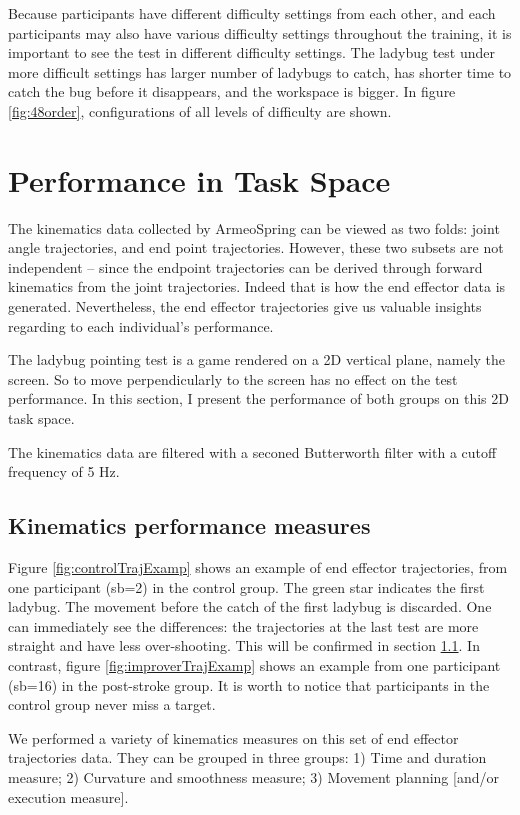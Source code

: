 Because participants have different difficulty settings from each other, and each participants may also have various difficulty settings throughout the training, it is important to see the test in different difficulty settings. The ladybug test under more difficult settings has larger number of ladybugs to catch, has shorter time to catch the bug before it disappears, and the workspace is bigger. In figure \ref{fig:48order}, configurations of all levels of difficulty are shown.

\section{Performance in Task Space}

The kinematics data collected by ArmeoSpring can be viewed as two folds: joint angle trajectories, and end point trajectories. However, these two subsets are not independent -- since the endpoint trajectories can be derived through forward kinematics from the joint trajectories. Indeed that is how the end effector data is generated. Nevertheless, the end effector trajectories give us valuable insights regarding to each individual's performance.

The ladybug pointing test is a game rendered on a 2D vertical plane, namely the screen. So to move perpendicularly to the screen has no effect on the test performance. In this section, I present the performance of both groups on this 2D task space.

The kinematics data are filtered with a seconed Butterworth filter with a cutoff frequency of 5 Hz.

\subsection{Kinematics performance measures}

Figure \ref{fig:controlTrajExamp} shows an example of end effector trajectories, from one participant (sb=2) in the control group. The green star indicates the first ladybug. The movement before the catch of the first ladybug is discarded. One can immediately see the differences: the trajectories at the last test are more straight and have less over-shooting. This will be confirmed in section \ref{}. In contrast, figure \ref{fig:improverTrajExamp} shows an example from one participant (sb=16) in the post-stroke group. It is worth to notice that participants in the control group never miss a target.

We performed a variety of kinematics measures on this set of end effector trajectories data. They can be grouped in three groups: 1) Time and duration measure; 2) Curvature and smoothness measure; 3) Movement planning [and/or execution measure]. 

